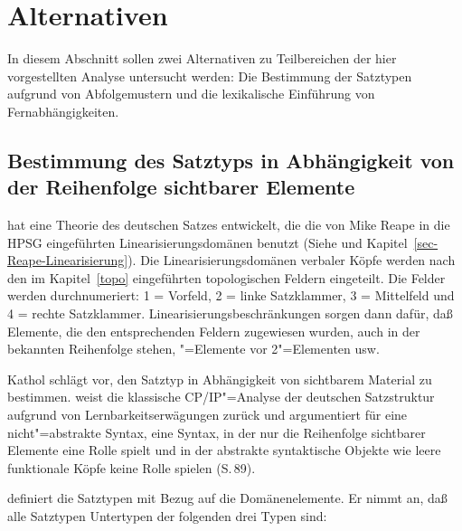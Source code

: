 \section{Alternativen}



In diesem Abschnitt sollen zwei Alternativen zu Teilbereichen der hier vorgestellten
Analyse untersucht werden: Die Bestimmung der Satztypen aufgrund von Abfolgemustern und die
lexikalische Einführung von Fernabhängigkeiten.

\subsection{Bestimmung des Satztyps in Abhängigkeit von der Reihenfolge sichtbarer Elemente}
\label{sec-satztypen-kathol}

\mbox{}\citet{Kathol95a,Kathol97a,Kathol2000a,Kathol2001a} hat eine Theorie des deutschen
Satzes entwickelt, die die von Mike Reape in die HPSG eingeführten Linearisierungsdomänen
benutzt (Siehe  und Kapitel~\ref{sec-Reape-Linearisierung}).
Die Linearisierungsdomänen verbaler Köpfe werden nach den im Kapitel~\ref{topo} eingeführten topologischen Feldern
eingeteilt. Die Felder werden durchnumeriert: 1 = Vorfeld, 2 = linke Satzklammer, 3 = Mittelfeld
und 4 = rechte Satzklammer. Linearisierungsbeschränkungen sorgen dann dafür, daß Elemente,
die den entsprechenden Feldern zugewiesen wurden, auch in der bekannten Reihenfolge stehen,
"=Elemente vor 2"=Elementen usw.

Kathol schlägt vor, den Satztyp in Abhängigkeit von sichtbarem Material zu bestimmen.
\citet{Kathol97a} weist die klassische CP/IP"=Analyse der deutschen Satzstruktur aufgrund von
Lernbarkeitserwägungen zurück und argumentiert für eine nicht"=abstrakte Syntax, \dash
eine Syntax, in der nur die Reihenfolge sichtbarer Elemente eine Rolle spielt und in der
abstrakte syntaktische Objekte wie \zb leere funktionale Köpfe keine Rolle spielen (S.\,89).


\citet{Kathol2001a} definiert die Satztypen mit Bezug auf die Domänenelemente.
Er nimmt an, daß alle Satztypen Untertypen der folgenden drei Typen sind:
\eal
\label{clause-types}
\ex\label{v1-clause-type}  \impl {}


